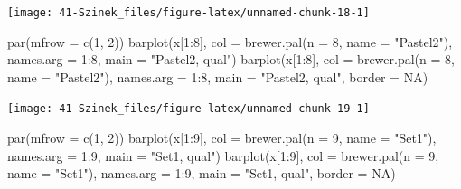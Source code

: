 \documentclass[
]{book}
\newenvironment{Shaded}{\begin{snugshade}}{\end{snugshade}}
\newcommand{\AttributeTok}[1]{\textcolor[rgb]{0.77,0.63,0.00}{#1}}
\newcommand{\ConstantTok}[1]{\textcolor[rgb]{0.00,0.00,0.00}{#1}}
\newcommand{\DecValTok}[1]{\textcolor[rgb]{0.00,0.00,0.81}{#1}}
\newcommand{\FunctionTok}[1]{\textcolor[rgb]{0.00,0.00,0.00}{#1}}
\newcommand{\NormalTok}[1]{#1}
\newcommand{\SpecialCharTok}[1]{\textcolor[rgb]{0.00,0.00,0.00}{#1}}
\newcommand{\StringTok}[1]{\textcolor[rgb]{0.31,0.60,0.02}{#1}}
\begin{document}
\begin{center}\texttt{[image: 41-Szinek\_files/figure-latex/unnamed-chunk-18-1]} \end{center}

\begin{Shaded}
\begin{Highlighting}[]
\FunctionTok{par}\NormalTok{(}\AttributeTok{mfrow =} \FunctionTok{c}\NormalTok{(}\DecValTok{1}\NormalTok{, }\DecValTok{2}\NormalTok{))}
\FunctionTok{barplot}\NormalTok{(x[}\DecValTok{1}\SpecialCharTok{:}\DecValTok{8}\NormalTok{], }\AttributeTok{col =} \FunctionTok{brewer.pal}\NormalTok{(}\AttributeTok{n =} \DecValTok{8}\NormalTok{, }\AttributeTok{name =} \StringTok{"Pastel2"}\NormalTok{), }\AttributeTok{names.arg =} \DecValTok{1}\SpecialCharTok{:}\DecValTok{8}\NormalTok{, }
    \AttributeTok{main =} \StringTok{"Pastel2, qual"}\NormalTok{)}
\FunctionTok{barplot}\NormalTok{(x[}\DecValTok{1}\SpecialCharTok{:}\DecValTok{8}\NormalTok{], }\AttributeTok{col =} \FunctionTok{brewer.pal}\NormalTok{(}\AttributeTok{n =} \DecValTok{8}\NormalTok{, }\AttributeTok{name =} \StringTok{"Pastel2"}\NormalTok{), }\AttributeTok{names.arg =} \DecValTok{1}\SpecialCharTok{:}\DecValTok{8}\NormalTok{, }
    \AttributeTok{main =} \StringTok{"Pastel2, qual"}\NormalTok{, }\AttributeTok{border =} \ConstantTok{NA}\NormalTok{)}
\end{Highlighting}
\end{Shaded}

\begin{center}\texttt{[image: 41-Szinek\_files/figure-latex/unnamed-chunk-19-1]} \end{center}

\begin{Shaded}
\begin{Highlighting}[]
\FunctionTok{par}\NormalTok{(}\AttributeTok{mfrow =} \FunctionTok{c}\NormalTok{(}\DecValTok{1}\NormalTok{, }\DecValTok{2}\NormalTok{))}
\FunctionTok{barplot}\NormalTok{(x[}\DecValTok{1}\SpecialCharTok{:}\DecValTok{9}\NormalTok{], }\AttributeTok{col =} \FunctionTok{brewer.pal}\NormalTok{(}\AttributeTok{n =} \DecValTok{9}\NormalTok{, }\AttributeTok{name =} \StringTok{"Set1"}\NormalTok{), }\AttributeTok{names.arg =} \DecValTok{1}\SpecialCharTok{:}\DecValTok{9}\NormalTok{, }\AttributeTok{main =} \StringTok{"Set1, qual"}\NormalTok{)}
\FunctionTok{barplot}\NormalTok{(x[}\DecValTok{1}\SpecialCharTok{:}\DecValTok{9}\NormalTok{], }\AttributeTok{col =} \FunctionTok{brewer.pal}\NormalTok{(}\AttributeTok{n =} \DecValTok{9}\NormalTok{, }\AttributeTok{name =} \StringTok{"Set1"}\NormalTok{), }\AttributeTok{names.arg =} \DecValTok{1}\SpecialCharTok{:}\DecValTok{9}\NormalTok{, }\AttributeTok{main =} \StringTok{"Set1, qual"}\NormalTok{, }
    \AttributeTok{border =} \ConstantTok{NA}\NormalTok{)}
\end{Highlighting}
\end{Shaded}
\end{document}
